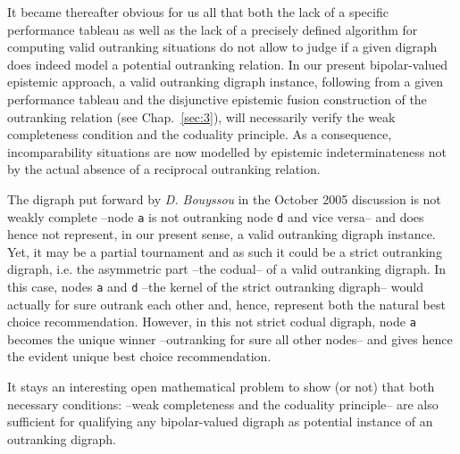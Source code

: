 It became thereafter obvious for us all that both the lack of a specific performance tableau as well as the lack of a precisely defined algorithm for computing valid outranking situations do not allow to judge if a given digraph does indeed model a potential outranking relation. In our present bipolar-valued epistemic approach, a valid outranking digraph instance, following from a given performance tableau and the disjunctive epistemic fusion construction of the outranking relation (see Chap.~\ref{sec:3}), will necessarily verify the weak completeness condition and the coduality principle. As a consequence, incomparability situations are now modelled by epistemic indeterminateness not by the actual absence of a reciprocal outranking relation.

The digraph put forward by \emph{D. Bouyssou} in the October 2005 discussion is not weakly complete --node \texttt{a} is not outranking node \texttt{d} and vice versa-- and does hence not represent, in our present sense, a valid outranking digraph instance. Yet, it may be a partial tournament and as such it could be a strict outranking digraph, i.e. the asymmetric part --the codual-- of a valid outranking digraph. In this case, nodes \texttt{a} and \texttt{d} --the kernel of the strict outranking digraph-- would actually for sure outrank each other and, hence, represent both the natural best choice recommendation. However, in this not strict codual digraph, node \texttt{a} becomes the unique \Condorcet winner --outranking for sure all other nodes-- and gives hence the evident unique best choice recommendation.

It stays an interesting open mathematical problem to show (or not) that both necessary conditions: --weak completeness and the coduality principle-- are also sufficient for qualifying any bipolar-valued digraph as potential instance of an outranking digraph.


%


